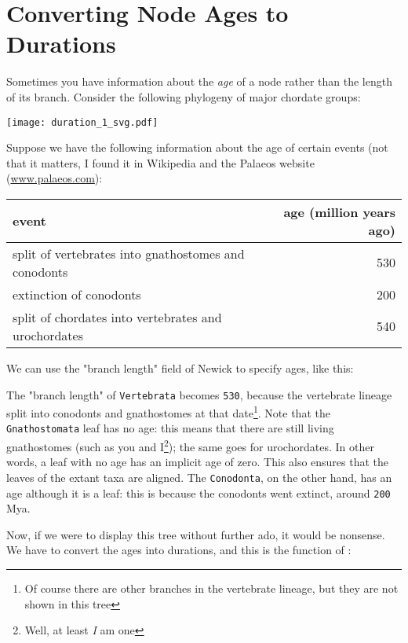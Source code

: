 \section{Converting
Node Ages to Durations}
\label{sct_duration}

Sometimes you have information about the \textit{age} of a node rather than the
length of its branch. Consider the following phylogeny of major chordate groups:

\begin{center}
 \texttt{[image: duration\_1\_svg.pdf]}
\end{center}

Suppose we have the following information about the age of certain events (not
that it matters, I found it in Wikipedia and the Palaeos website
(\url{www.palaeos.com}):

\smallskip
\begin{tabular}{lr}
\textbf{event} & \textbf{age} (million years ago)\\
\hline
split of vertebrates into gnathostomes and conodonts & 530 \\
extinction of conodonts & 200 \\
split of chordates into vertebrates and urochordates & 540 \\
\end{tabular}
\smallskip

\noindent{}We can use the "branch length" field of Newick to specify ages, like
this:

\begin{samepage}


\end{samepage}

\noindent{}The "branch length" of \texttt{Vertebrata} becomes \texttt{530},
because the vertebrate lineage split into conodonts and gnathostomes at that
date\footnote{Of course there are other branches in the vertebrate lineage, but
they are not shown in this tree}. Note that the \texttt{Gnathostomata} leaf has
no age: this means that there are still living gnathostomes (such as you and
I\footnote{Well, at least \textit{I} am one}); the same goes for urochordates.
In other words, a leaf with no age has an implicit age of zero. This also
ensures that the leaves of the extant taxa are aligned.  The \texttt{Conodonta},
on the other hand, has an age although it is a leaf: this is because the
conodonts went extinct, around \texttt{200} Mya.

Now, if we were to display this tree without further ado, it would be nonsense.
We have to convert the ages into durations, and this is the function of
\duration{}:

